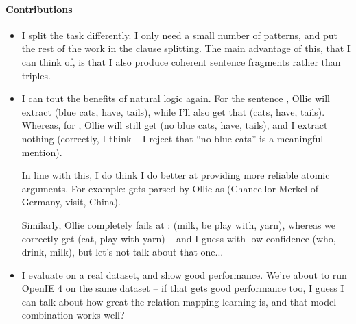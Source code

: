 \paragraph{Contributions}
\begin{itemize}
  \item I split the task differently. I only need a small number of
        patterns, and put the rest of the work in the clause splitting.
        The main advantage of this, that I can think of, is that I also
        produce coherent sentence fragments rather than triples.

  \item I can tout the benefits of natural logic again.
        For the sentence , Ollie will extract
        (blue cats, have, tails), while I'll also get that
        (cats, have, tails).
        Whereas, for , Ollie will still get
        (no blue cats, have, tails), and I extract nothing (correctly,
        I think -- I reject that ``no blue cats'' is a meaningful mention).

        In line with this, I do think I do better at providing more reliable
        atomic arguments. For example:
         gets parsed
        by Ollie as (Chancellor Merkel of Germany, visit, China).

        Similarly, Ollie completely fails at 
        : 
        (milk, be play with, yarn), whereas we correctly get
        (cat, play with yarn) -- and I guess with low confidence
        (who, drink, milk), but let's not talk about that one...

  \item I evaluate on a real dataset, and show good performance.    
        We're about to run OpenIE 4 on the same dataset -- if that gets good
        performance too, I guess I can talk about how great the relation
        mapping learning is, and that model combination works well?
\end{itemize}


